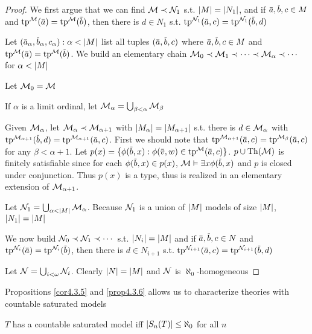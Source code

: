 \documentclass[11pt]{article}
\begin{document}
\begin{proof}
We first argue that we can find \(\mathcal{M}\prec\mathcal{N}_1\) s.t. \(\abs{M}=\abs{N_1}\), and if \(\bara,\barb,c\in M\)
and \(\tp^{\calm}(\bara)=\tp^{\calm}(\barb)\), then there is \(d\in N_1\)
s.t. \(\tp^{\caln_1}(\bara,c)=\tp^{\caln_1}(\barb,d)\)

Let \((\bara_\alpha,\barb_\alpha,c_\alpha):\alpha<\abs{M}\) list all tuples \((\bara,\barb,c)\)
where \(\bara,\barb,c\in M\) and \(\tp^{\calm}(\bara)=\tp^{\calm}(\barb)\). We build an elementary
chain \(\mathcal{M}_0\prec\mathcal{M}_1\prec\dots\prec\mathcal{M}_\alpha\prec\cdots\) for \(\alpha<\abs{M}\)

Let \(\mathcal{M}_0=\mathcal{M}\)

If \(\alpha\) is a limit ordinal, let \(\mathcal{M}_\alpha=\bigcup_{\beta<\alpha}\mathcal{M}_\beta\)

Given \(\mathcal{M}_\alpha\), let \(\mathcal{M}_\alpha\prec\mathcal{M}_{\alpha+1}\) with \(\abs{M_\alpha}=\abs{M_{\alpha+1}}\) s.t. there is \(d\in\mathcal{M}_\alpha\)
with \(\tp^{\calm_{\alpha+1}}(\barb,d)=\tp^{\calm_{\alpha+1}}(\bara,c)\). First we should note
that \(\tp^{\calm_{\alpha+1}}(\bara,c)=\tp^{\calm_\beta}(\bara,c)\) for any \(\beta<\alpha+1\).
Let \(p(x)=\{\phi(\barb,x):\phi(\barv,w)\in\tp^{\calm}(\bara,c)\}\). \(p\cup\operatorname{Th}(\mathcal{M})\) is finitely satisfiable
since for each \(\phi(\barb,x)\in p(x)\), \(\calm\vDash\exists x\phi(\barb,x)\) and \(p\) is closed under conjunction.
Thus \(p(x)\) is a type, thus is realized in an elementary extension of \(\mathcal{M}_{\alpha+1}\).


Let \(\caln_1=\bigcup_{\alpha<\abs{M}}\calm_\alpha\).
Because \(\mathcal{N}_1\) is a union of \(\abs{M}\) models of size \(\abs{M}\), \(\abs{N_1}=\abs{M}\)

We now build \(\mathcal{N}_0\prec\mathcal{N}_1\prec\cdots\) s.t. \(\abs{N_i}=\abs{M}\) and if \(\bara,\barb,c\in N\)
and \(\tp^{\caln_i}(\bara)=\tp^{\caln_i}(\barb)\), then there is \(d\in N_{i+1}\)
s.t. \(\tp^{\caln_{i+1}}(\bara,c)=\tp^{\caln_{i+1}}(\barb,d)\)

Let \(\mathcal{N}=\bigcup_{i<\omega}\mathcal{N}_i\). Clearly \(\abs{N}=\abs{M}\) and \(\mathcal{N}\) is \(\aleph_0\)-homogeneous
\end{proof}

Propositions \ref{cor4.3.5} and \ref{prop4.3.6} allows us to characterize theories with countable
saturated models

\begin{theorem}[]
\(T\) has a countable saturated model iff \(\abs{S_n(T)}\le\aleph_0\) for all \(n\)
\end{theorem}
\end{document}
